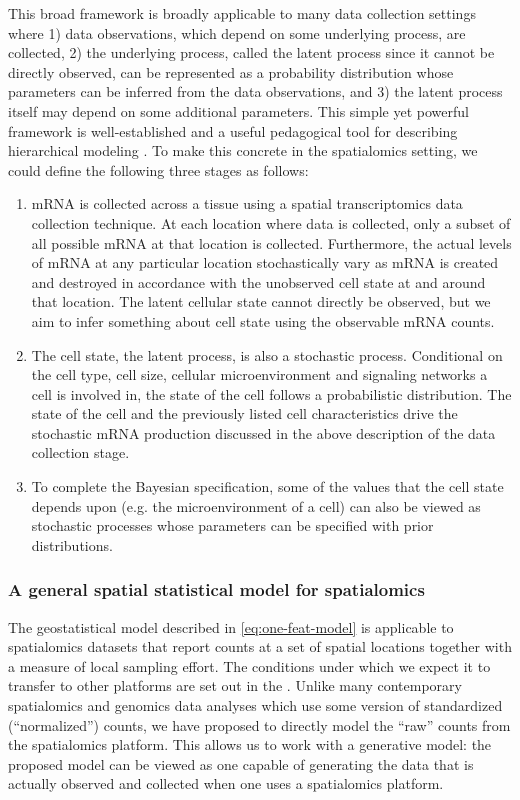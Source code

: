 \documentclass[10pt,letterpaper]{article}
\begin{document}
This broad framework is broadly applicable to many data collection settings where 1) data observations, which depend on some underlying process, are collected, 2) the underlying process, called the latent process since it cannot be directly observed, can be represented as a probability distribution whose parameters can be inferred from the data observations, and 3) the latent process itself may depend on some additional parameters. This simple yet powerful framework is well-established and a useful pedagogical tool for describing hierarchical modeling \cite{cressie2011statistics}. To make this concrete in the spatialomics setting, we could define the following three stages as follows:
\begin{enumerate}
    \item mRNA is collected across a tissue using a spatial transcriptomics data collection technique. At each location where data is collected, only a subset of all possible mRNA at that location is collected. Furthermore, the actual levels of mRNA at any particular location stochastically vary as mRNA is created and destroyed in accordance with the unobserved cell state at and around that location. The latent cellular state cannot directly be observed, but we aim to infer something about cell state using the observable mRNA counts.
    \item The cell state, the latent process, is also a stochastic process. Conditional on the cell type, cell size, cellular microenvironment and signaling networks a cell is involved in, the state of the cell follows a probabilistic distribution. The state of the cell and the previously listed cell characteristics drive the stochastic mRNA production discussed in the above description of the data collection stage.
    \item To complete the Bayesian specification, some of the values that the cell state depends upon (e.g. the microenvironment of a cell) can also be viewed as stochastic processes whose parameters can be specified with prior distributions.
\end{enumerate}

\subsubsection*{A general spatial statistical model for spatialomics}

The geostatistical model described in \eqref{eq:one-feat-model} is applicable to spatialomics datasets that report counts at a set of spatial locations together with a measure of local sampling effort. The conditions under which we expect it to transfer to other platforms are set out in the . Unlike many contemporary spatialomics and genomics data analyses which use some version of standardized (``normalized'') counts, we have proposed to directly model the ``raw'' counts from the spatialomics platform. This allows us to work with a generative model: the proposed model can be viewed as one capable of generating the data that is actually observed and collected when one uses a spatialomics platform.
\end{document}
